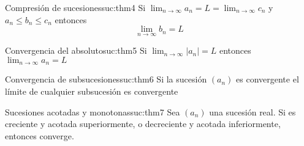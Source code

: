 \begin{teorema}{Compresión de sucesiones}{suc:thm4}
    Si $\lim_{n \to \infty} a_n = L = \lim_{n \to \infty} c_n$ y $a_n \leq b_n \leq c_n$ entonces
    \[ 
        \lim_{n \to \infty} b_n = L
    \]
\end{teorema}

\begin{teorema}{Convergencia del absoluto}{suc:thm5}
    Si $\lim_{n \to \infty} \lvert a_n \rvert = L$ entonces $\lim_{n \to \infty} a_n = L$
\end{teorema}

\begin{teorema}{Convergencia de subsucesiones}{suc:thm6}
    Si la sucesión $(a_n)$ es convergente el límite de cualquier subsucesión es convergente
\end{teorema}

\begin{teorema}{Sucesiones acotadas y monotonas}{suc:thm7}
    Sea $(a_n)$ una sucesión real. 
    Si es creciente y acotada superiormente, o decreciente y acotada inferiormente, entonces converge.
\end{teorema}

